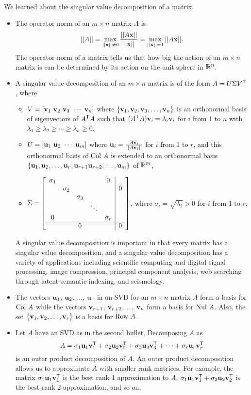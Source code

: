 
We learned about the singular value decomposition of a matrix. 
\begin{itemize}
\item The operator norm of an $m \times n$ matrix $A$ is  
\[||A|| = \max_{||\mathbf{x}|| \neq 0} \frac{||A\mathbf{x}||}{||\mathbf{x}||} = \max_{||\mathbf{x}||=1} ||A\mathbf{x}|| .\]
The operator norm of a matrix tells us that how big the action of an $m \times n$ matrix is can be determined by its action on the unit sphere in $\mathbb{R}^n$. 
\item A singular value decomposition of an $m \times n$ matrix is of the form $A = U \Sigma V^{\mathsf{T}}$, where 
	\begin{itemize}
	\item $V= [\mathbf{v}_1 \ \mathbf{v}_2 \ \mathbf{v}_3 \  \cdots \  \mathbf{v}_n ]$ where $\{\mathbf{v}_1, \mathbf{v}_2, \mathbf{v}_3, \ldots, \mathbf{v}_n\}$ is an  orthonormal basis of eigenvectors of $A^{\mathsf{T}}A$ such that $(A^{\mathsf{T}}A) \mathbf{v}_i = \lambda_i \mathbf{v}_i$ for $i$ from 1 to $n$ with $\lambda_1 \geq \lambda_{2} \geq \cdots \geq \lambda_n \geq 0$,
	\item $U = [\vu_1 \ \vu_2 \ \cdots \ \vu_m]$ where $\mathbf{u}_i = \frac{A\mathbf{v}_i}{||A\mathbf{v}_i||}$ for $i$ from 1 to $r$, and this orthonormal basis of $\text{Col } A$ is extended to an orthonormal basis $\{\mathbf{u}_1, \mathbf{u}_2, \ldots, \mathbf{u}_r, \mathbf{u}_{r+1} \mathbf{u}_{r+2}, \ldots, \mathbf{u}_m\}$ of $\mathbb{R}^m$,
	\item $\Sigma = \left[ \begin{array}{ccccc|c} \sigma_1&&&&0& \\ & \sigma_2&&&&0 \\ && \sigma_3&&& \\ &  & & \ddots & & \\ 0&&&& \sigma_r \\ \hline &&0&&&0 \end{array} \right]$, where $\sigma_i = \sqrt{\lambda_i} > 0$ for $i$ from 1 to $r$. 
	\end{itemize}
A singular value decomposition is important in that every matrix has a singular value decomposition, and a singular value decomposition has a variety of applications including scientific computing and digital signal processing, image compression, principal component analysis, web searching through latent semantic indexing, and seismology. 
\item The vectors $\mathbf{u}_1$, $\mathbf{u}_2$, $\ldots$, $\mathbf{u}_r$ in an SVD for an $m \times n$ matrix $A$ form a basis for $\text{Col } A$ while the vectors $\mathbf{v}_{r+1}$, $\mathbf{v}_{r+2}$, $\ldots$, $\mathbf{v}_n$ form a basis for $\text{Nul } A$.  Also, the set $\{\mathbf{v}_1, \mathbf{v}_2, \ldots, \mathbf{v}_r\}$ is a basis for $\text{Row } A$.
\item Let $A$ have an SVD as in the second bullet. Decomposing $A$ as 
\[A =\sigma_1 \mathbf{u}_1\mathbf{v}_1^{\mathsf{T}} + \sigma_2 \mathbf{u}_2\mathbf{v}_2^{\mathsf{T}} + \sigma_3 \mathbf{u}_3\mathbf{v}_3^{\mathsf{T}} + \cdots + \sigma_r \mathbf{u}_r\mathbf{v}_r^{\mathsf{T}}\] 
is an outer product decomposition of $A$. An outer product decomposition allows us to approximate $A$ with smaller rank matrices. For example, the matrix $\sigma_1 \mathbf{u}_1\mathbf{v}_1^{\mathsf{T}}$ is the best rank 1 approximation to $A$, $\sigma_1 \mathbf{u}_1\mathbf{v}_1^{\mathsf{T}} + \sigma_2 \mathbf{u}_2\mathbf{v}_2^{\mathsf{T}} $ is the best rank 2 approximation, and so on. 

\end{itemize}

